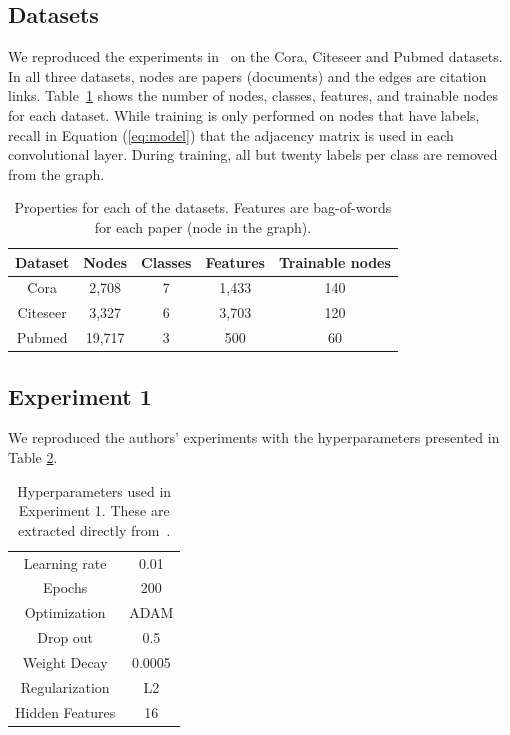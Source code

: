 \subsection{Datasets}

We reproduced the experiments in~\cite{Kipf2016} on the Cora, Citeseer and Pubmed datasets. In all three datasets, nodes are papers (documents) and the edges are citation links. Table~\ref{tab:datasets} shows the number of nodes, classes, features, and trainable nodes for each dataset. While training is only performed on nodes that have labels, recall in Equation (\ref{eq:model}) that the adjacency matrix is used in each convolutional layer. During training, all but twenty labels per class are removed from the graph. 

\begin {table}[ht!]
  \begin{center}
    \begin{tabular}{|c|c|c|c|c|}
    \hline
    Dataset  & Nodes  & Classes & Features & Trainable nodes\\
    \hline 
    Cora     & 2,708  & 7       & 1,433    & 140 \\ 
    Citeseer & 3,327  & 6       & 3,703    & 120  \\  
    Pubmed   & 19,717 & 3       & 500      & 60   \\
    \hline
    \end{tabular}
  \end{center}
\caption {Properties for each of the datasets. Features are bag-of-words for each paper (node in the graph).} \label{tab:datasets} 
\end{table}

\subsection{Experiment 1}

We reproduced the authors' experiments with the hyperparameters presented in Table \ref{tab:hyperparameters1}.

\begin {table}[ht!]
  \begin{center}
    \begin{tabular}{|c|c|}
    \hline
    Learning rate     & 0.01 \\ 
    Epochs            & 200  \\ 
    Optimization      & ADAM \\
    Drop out          & 0.5   \\
    Weight Decay      & 0.0005 \\
    Regularization    & L2    \\
    Hidden Features   & 16    \\
    \hline
    \end{tabular}
  \end{center}
\caption {Hyperparameters used in Experiment 1. These are extracted directly from~\cite{Kipf2016}.} \label{tab:hyperparameters1} 
\end{table}

